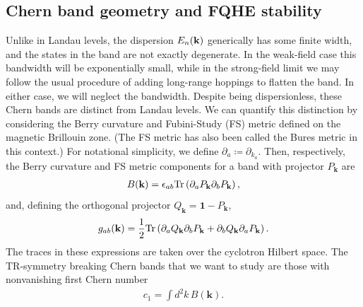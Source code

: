 \documentclass[aps,prb,twocolumn,letterpaper,twoside,nobalancelastpage,groupedaddress,amsmath,amssymb,floatfix,citeautoscript]{revtex4-1}
\begin{document}
\subsection{Chern band geometry and FQHE stability}
Unlike in Landau levels, the dispersion $E_{n}({\bf k})$ generically has some finite width, and the states in the band are not exactly degenerate. In the weak-field case this bandwidth will be exponentially small\cite{Harper:2014vi}, while in the strong-field limit we may follow the usual procedure of adding long-range hoppings to flatten the band. \cite{Bergholtz:2013ue,parameswaran_fractional_2013} In either case, we will neglect the bandwidth. Despite being dispersionless, these Chern bands are distinct from Landau levels. We can quantify this distinction by considering the Berry curvature and Fubini-Study (FS) metric defined on the magnetic Brillouin zone\cite{parameswaran_fractional_2013,roy_band_2014,Claassen2015}. (The FS metric has also been called the Bures metric in this context.\cite{palumbo_momentum-space_2017}) For notational simplicity, we define $\partial_a \coloneqq \partial_{k_a}$. Then, respectively, the Berry curvature and FS metric components for a band with projector $P_{\mathbf{k}}$ are
\begin{align*}
B({\bf k}) = \epsilon_{ab}\text{Tr}\left(\partial_{a}P_{\mathbf{k}}\partial_b P_{\mathbf{k}}\right),
\end{align*}
and, defining the orthogonal projector $Q_{\mathbf{k}} = \mathbf{1} - P_{\mathbf{k}}$,
\begin{align*}
g_{ab}({\bf k}) = \frac{1}{2}\text{Tr}\left(\partial_{a}Q_{\mathbf{k}}\partial_{b}P_{\mathbf{k}} + \partial_{b}Q_{\mathbf{k}}\partial_{a} P_{\mathbf{k}}\right). \\
\end{align*}
The traces in these expressions are taken over the cyclotron Hilbert space. The TR-symmetry breaking Chern bands that we want to study are those with nonvanishing first Chern number 
\begin{align*}
c_1 = \int d^2k\, B(\mathbf{k}).
\end{align*}
\end{document}
